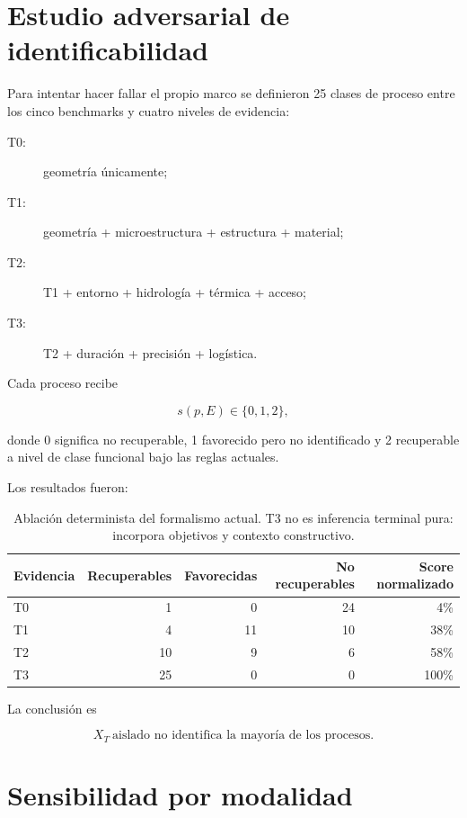 
\section{Estudio adversarial de identificabilidad}

Para intentar hacer fallar el propio marco se definieron 25 clases de proceso entre los cinco benchmarks y cuatro niveles de evidencia:

\begin{description}
\item[T0:] geometría únicamente;
\item[T1:] geometría + microestructura + estructura + material;
\item[T2:] T1 + entorno + hidrología + térmica + acceso;
\item[T3:] T2 + duración + precisión + logística.
\end{description}

Cada proceso recibe

\begin{equation}
s(p,E)\in\{0,1,2\},
\end{equation}

donde 0 significa no recuperable, 1 favorecido pero no identificado y 2 recuperable a nivel de clase funcional bajo las reglas actuales.

Los resultados fueron:

\begin{table}[ht]
\centering
\begin{tabular}{lrrrr}
\toprule
Evidencia & Recuperables & Favorecidas & No recuperables & Score normalizado \\
\midrule
T0 & 1 & 0 & 24 & 4\% \\
T1 & 4 & 11 & 10 & 38\% \\
T2 & 10 & 9 & 6 & 58\% \\
T3 & 25 & 0 & 0 & 100\% \\
\bottomrule
\end{tabular}
\caption{Ablación determinista del formalismo actual. T3 no es inferencia terminal pura: incorpora objetivos y contexto constructivo.}
\end{table}

La conclusión es

\begin{equation}
\boxed{
X_T\ \text{aislado no identifica la mayoría de los procesos}.
}
\end{equation}

\section{Sensibilidad por modalidad}

